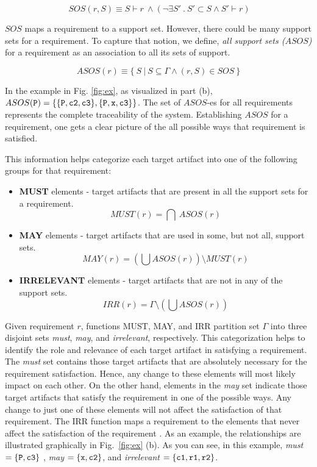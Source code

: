 $$ \ SOS(r, S) \equiv S \vdash r~ \land   (\neg\exists S'\ .\ S' \subset S \wedge S' \vdash r) $$

$SOS$ maps a requirement to a support set. However, there could be many support sets for a requirement. To capture that notion, we define, \emph{all support sets ($ASOS$)} for a requirement as an association to all its sets of support.


$$ ASOS(r) \equiv  \{\ S~|~S \subseteq \Gamma \land (r,S) \in SOS\ \} $$

In the example in Fig. \ref{fig:ex}, as visualized in part (b),
$ASOS ({\tt P}) = \{\{{\tt P}, {\tt c2}, {\tt c3}\}, \{{\tt P}, {\tt x}, {\tt c3}\}\}$. The set of $ASOS$-es for all requirements represents the complete traceability of the system. Establishing $ASOS$ for a requirement, one gets a clear picture of the all possible ways that requirement is satisfied. 


This information helps categorize each target artifact into one of the following groups for that requirement:

\begin{itemize}
  \item \textbf{MUST} elements - target artifacts that are present in all the support sets for a requirement.
      $$ MUST (r) = \bigcap \ ASOS(r) $$

  \item \textbf{MAY} elements - target artifacts that are used in some, but not all, support sets.
      $$MAY(r) = (\bigcup ASOS (r)) \setminus MUST (r) $$

  \item \textbf{IRRELEVANT} elements - target artifacts that are not in any of the support sets. $$IRR(r) = \Gamma \setminus (\bigcup ASOS (r))$$
\end{itemize}

Given requirement $r$, functions MUST, MAY, and IRR partition set $\Gamma$ into three disjoint sets \emph{must}, \emph{may}, and \emph{irrelevant}, respectively. This categorization helps to identify the role and relevance of each target artifact in satisfying a requirement. The \emph{must} set contains those target artifacts that are absolutely necessary for the requirement satisfaction. Hence, any change to these elements will most likely impact on each other. On the other hand, elements in the \emph{may} set indicate those target artifacts that satisfy the requirement in one of the possible ways.  Any change to just one of these elements will not affect the satisfaction of that requirement. The IRR function maps a requirement to the elements that never affect the satisfaction of the requirement \cite{Murugesan16:renext}. As an example, the relationships are illustrated graphically in Fig.~\ref{fig:ex} (b). As you can see, in this example,
\emph{must} $= \{ {\tt P}, {\tt c3}\}$ ,
\emph{may} $= \{ {\tt x}, {\tt c2}\}$, and \emph{irrelevant} $= \{ {\tt c1}, {\tt r1}, {\tt r2}\}$.

